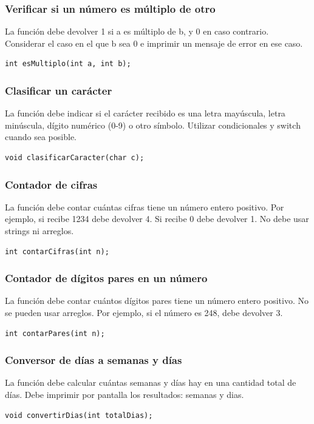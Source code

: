 \subsubsection{Verificar si un número es múltiplo de otro}
La función debe devolver 1 si a es múltiplo de b, y 0 en caso contrario. Considerar el caso en el que b sea 0 e imprimir un mensaje de error en ese caso.
\begin{lstlisting}[style=customc, basicstyle=\ttfamily]
int esMultiplo(int a, int b);
\end{lstlisting}

\subsubsection{Clasificar un carácter}
La función debe indicar si el carácter recibido es una letra mayúscula, letra minúscula, dígito numérico (0-9) o otro símbolo. Utilizar condicionales y switch cuando sea posible.
\begin{lstlisting}[style=customc, basicstyle=\ttfamily]
void clasificarCaracter(char c);
\end{lstlisting}

\subsubsection{Contador de cifras}
La función debe contar cuántas cifras tiene un número entero positivo. Por ejemplo, si recibe 1234 debe devolver 4. Si recibe 0 debe devolver 1. No debe usar strings ni arreglos.
\begin{lstlisting}[style=customc, basicstyle=\ttfamily]
int contarCifras(int n);
\end{lstlisting}

\subsubsection{Contador de dígitos pares en un número}
La función debe contar cuántos dígitos pares tiene un número entero positivo. No se pueden usar arreglos. Por ejemplo, si el número es 248, debe devolver 3.
\begin{lstlisting}[style=customc, basicstyle=\ttfamily]
int contarPares(int n);
\end{lstlisting}

\subsubsection{Conversor de días a semanas y días}
La función debe calcular cuántas semanas y días hay en una cantidad total de días. Debe imprimir por pantalla los resultados: semanas y dias.
\begin{lstlisting}[style=customc, basicstyle=\ttfamily]
void convertirDias(int totalDias);
\end{lstlisting}

